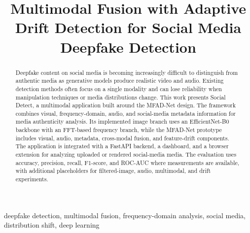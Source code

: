 \documentclass[conference]{IEEEtran}
\begin{document}
\title{Multimodal Fusion with Adaptive Drift Detection for Social Media Deepfake Detection}

\author{
\and
{}
\and
{}
}

\maketitle

\begin{abstract}
Deepfake content on social media is becoming increasingly difficult to distinguish from authentic media as generative models produce realistic video and audio. Existing detection methods often focus on a single modality and can lose reliability when manipulation techniques or media distributions change. This work presents Social Detect, a multimodal application built around the MFAD-Net design. The framework combines visual, frequency-domain, audio, and social-media metadata information for media authenticity analysis. Its implemented image branch uses an EfficientNet-B0 backbone with an FFT-based frequency branch, while the MFAD-Net prototype includes visual, audio, metadata, cross-modal fusion, and feature-drift components. The application is integrated with a FastAPI backend, a dashboard, and a browser extension for analyzing uploaded or rendered social-media media. The evaluation uses accuracy, precision, recall, F1-score, and ROC-AUC where measurements are available, with additional placeholders for filtered-image, audio, multimodal, and drift experiments.
\end{abstract}

\begin{IEEEkeywords}
deepfake detection, multimodal fusion, frequency-domain analysis, social media, distribution shift, deep learning
\end{IEEEkeywords}
\end{document}
